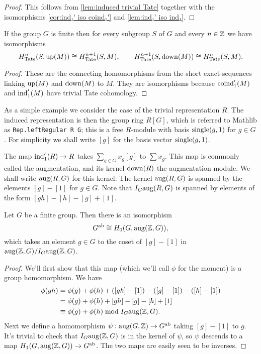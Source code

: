 \begin{proof}
	This follows from \ref{lem:induced trivial Tate}
	together with the isomorphisms \ref{cor:ind₁' iso coind₁'} and \ref{lem:ind₁' iso ind₁}.
\end{proof}


\begin{corollary}	\label{cor:Tate up down isos}
	\leanok
	If the group $G$ is finite then for every subgroup $S$ of $G$
	and every $n \in {\mathbb Z}$ we have isomorphisms
	\[
		H^n_{\mathrm{Tate}}(S, \mathrm{up}(M)) \cong H^{n+1}_{\mathrm{Tate}}(S,M),
		\qquad
		H^{n+1}_{\mathrm{Tate}}(S, \mathrm{down}(M)) \cong H^{n}_{\mathrm{Tate}}(S,M).
	\]
\end{corollary}

\begin{proof}
	These are the connecting homomorphisms from the
	short exact sequences linking $\mathrm{up}(M)$ and $\mathrm{down}(M)$ to $M$.
	They are isomorphisms because $\mathrm{coind}_1'(M)$ and $\mathrm{ind}_1'(M)$ have trivial Tate cohomology.
\end{proof}



As a simple example we consider the case of the trivial representation $R$.
The induced representation is then the group ring $R[G]$, which is referred to
Mathlib as \verb|Rep.leftRegular R G|; this is a free $R$-module with basis $\mathrm{single}(g,1)$ for $g \in G$.
For simplicity we shall write $[g]$ for the basis vector $\mathrm{single}(g,1)$.

The map $\mathrm{ind}_1'(R) \to R$ takes $\sum_{g\in G} x_g [g]$ to $\sum x_g$.
This map is commonly called the augmentation, and its kernel $\mathrm{down}(R)$ the augmentation module.
We shall write $\mathrm{aug}(R,G)$ for this kernel.
The kernel $\mathrm{aug}(R,G)$ is spanned by the elements $[g]-[1]$ for $g \in G$.
Note that $I_G \mathrm{aug}(R,G)$ is spanned by elements of the form $[gh]-[h] -[g] + [1]$.

\begin{lemma} \label{lem:homology 0 aug}
	Let $G$ be a finite group.
	Then there is an isomorphism
	\[
		G^{\mathrm{ab}} \cong H_0(G,\mathrm{aug}({\mathbb Z},G)),
	\]
	which takes an element $g \in G$ to the coset of $[g]-[1]$
	in $\mathrm{aug}({\mathbb Z},G) / I_G \mathrm{aug}({\mathbb Z},G)$.
\end{lemma}

\begin{proof}
	We'll first show that this map (which we'll call $\phi$ for the moment) is a group homomorphism.
	We have
	\begin{align*}
		\phi(gh)
		&= \phi(g) +\phi(h) + ([gh]-[1]) -([g]-[1]) - ([h]-[1])\\
		&= \phi(g) +\phi(h) + [gh] - [g] - [h] + [1]\\
		&\equiv \phi(g) +\phi(h) \bmod  I_G \mathrm{aug}({\mathbb Z},G).
	\end{align*}
	Next we define a homomorphism $\psi : \mathrm{aug}(G,{\mathbb Z}) \to G^{\mathrm{ab}}$ taking $[g]-[1]$ to $g$.
	It's trivial to check that $I_G\mathrm{aug}({\mathbb Z},G)$ is in the kernel of $\psi$, so $\psi$ descends to
	a map $H_1(G,\mathrm{aug}({\mathbb Z},G)) \to G^{\mathrm{ab}}$.
	The two maps are easily seen to be inverses.
\end{proof}


